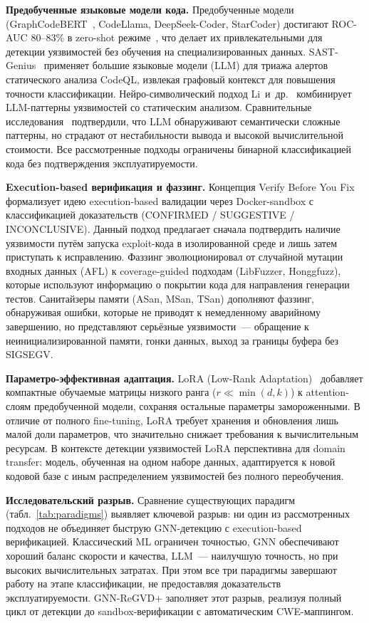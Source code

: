 \documentclass[runningheads]{llncs}
\begin{document}
\textbf{Предобученные языковые модели кода.}
Предобученные модели (GraphCodeBERT~\cite{guo2021graphcodebert}, CodeLlama, DeepSeek-Coder, StarCoder) достигают ROC-AUC 80--83\% в zero-shot режиме~\cite{ding2024}, что делает их привлекательными для детекции уязвимостей без обучения на специализированных данных. SAST-Genius~\cite{agrawal2025sast} применяет большие языковые модели (LLM) для триажа алертов статического анализа CodeQL, извлекая графовый контекст для повышения точности классификации. Нейро-символический подход Li~и~др.~\cite{li2025neurosymbolic} комбинирует LLM-паттерны уязвимостей со статическим анализом. Сравнительные исследования~\cite{sultana2024,makhyari2024} подтвердили, что LLM обнаруживают семантически сложные паттерны, но страдают от нестабильности вывода и высокой вычислительной стоимости. Все рассмотренные подходы ограничены бинарной классификацией кода без подтверждения эксплуатируемости.

\textbf{Execution-based верификация и фаззинг.}
Концепция Verify Before You Fix~\cite{gajjar2026vbf} формализует идею execution-based валидации через Docker-sandbox с классификацией доказательств (CONFIRMED / SUGGESTIVE / INCONCLUSIVE). Данный подход предлагает сначала подтвердить наличие уязвимости путём запуска exploit-кода в изолированной среде и лишь затем приступать к исправлению. Фаззинг эволюционировал от случайной мутации входных данных (AFL) к coverage-guided подходам (LibFuzzer, Honggfuzz), которые используют информацию о покрытии кода для направления генерации тестов. Санитайзеры памяти (ASan, MSan, TSan) дополняют фаззинг, обнаруживая ошибки, которые не приводят к немедленному аварийному завершению, но представляют серьёзные уязвимости~--- обращение к неинициализированной памяти, гонки данных, выход за границы буфера без SIGSEGV.

\textbf{Параметро-эффективная адаптация.}
LoRA (Low-Rank Adaptation)~\cite{hu2021lora} добавляет компактные обучаемые матрицы низкого ранга ($r \ll \min(d, k)$) к attention-слоям предобученной модели, сохраняя остальные параметры замороженными. В отличие от полного fine-tuning, LoRA требует хранения и обновления лишь малой доли параметров, что значительно снижает требования к вычислительным ресурсам. В контексте детекции уязвимостей LoRA перспективна для domain transfer: модель, обученная на одном наборе данных, адаптируется к новой кодовой базе с иным распределением уязвимостей без полного переобучения.

\textbf{Исследовательский разрыв.}
Сравнение существующих парадигм (табл.~\ref{tab:paradigms}) выявляет ключевой разрыв: ни один из рассмотренных подходов не объединяет быструю GNN-детекцию с execution-based верификацией. Классический ML ограничен точностью, GNN обеспечивают хороший баланс скорости и качества, LLM~--- наилучшую точность, но при высоких вычислительных затратах. При этом все три парадигмы завершают работу на этапе классификации, не предоставляя доказательств эксплуатируемости. GNN-ReGVD+ заполняет этот разрыв, реализуя полный цикл от детекции до sandbox-верификации с автоматическим CWE-маппингом.
\end{document}
